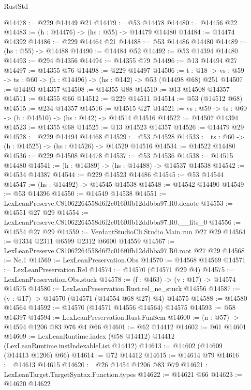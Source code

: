\begin{lexlean}{RustStd}
\begin{coremodule}
@14478 := @229 @14449 @21
@14479 := @53 @14478
@14480 := @14456 @22
@14483 := (h : @14476) -> (hs : @55) -> @14479 @14480
@14484 := @14474 @14392
@14486 := @229 @14464 @21
@14488 := @53 @14486 @14480
@14489 := (hs : @55) -> @14488
@14490 := @14484 @52
@14492 := @53 @14394 @14480
@14493 := @294 @14356
@14494 := @14355 @79
@14496 := @13 @14494 @27
@14497 := @14355 @76
@14498 := @229 @14497
@14506 := {t : @18} ->
  {vs : @59} -> {ts : @60} -> (h : @14496) -> (hs : @142) -> @53 (@14498 @68) @251
@14507 := @14493 @14357
@14508 := @14355 @88
@14510 := @13 @14508 @14357
@14511 := @14355 @66
@14512 := @229 @14511
@14514 := @53 (@14512 @68)
@14515 := @234 @14357
@14516 := @14515 @27
@14521 := {vs : @59} -> {ts : @60} -> (h : @14510) -> (hs : @142) -> @14514 @14516
@14522 := @14507 @14394
@14523 := @14355 @68
@14525 := @13 @14523 @14357
@14526 := @14479 @29
@14528 := @229 @14494 @14468
@14529 := @53 @14528
@14533 := {ts : @60} -> (h : @14525) -> (hs : @14526) -> @14529 @14516
@14534 := @14522 @14480
@14536 := @229 @14508 @14478
@14537 := @53 @14536
@14538 := @14515 @14480
@14541 := (h : @14389) -> (hs : @14488) -> @14537 @14538
@14542 := @14534 @14387
@14544 := @229 @14523 @14486
@14545 := @53 @14544
@14547 := (hs : @14492) -> @14545 @14538
@14548 := @14542 @14490
@14549 := @53 @14396
@14550 := @14549 @14538
@14551 := LexLeanPreserve.C81062264558d6f2c016f0fb12ddbba97.R0.denote
@14553 := @14551 @27 @29
@14554 := LexLeanPreserve.C81062264558d6f2c016f0fb12ddbba97.R0.__fits_0
@14556 := @14554 @27 @29
@14559 := VerdantStudioCli.Studio.Main.run @27 @29
@14564 := @1334 @2311 @6599 @2312 @6600 @14559
@14567 := LexLeanPreserve.C81062264558d6f2c016f0fb12ddbba97.R0.root @27 @29
@14568 := Ne.{1}
@14569 := LexLeanPreservation.Obs
@14570 := @14568 @14569
@14571 := LexLeanPreservation.Rel
@14574 := @14570 (@14571 @29 @4)
@14575 := LexLeanPreservation.Obs.stuck
@14578 := (f : @463) -> (v : @17) -> @14574 @14575
@14580 := LexLeanPreservation.Rust.rel_ne_stuck @14556
@14587 := (v : @17) -> @14570 (@14571 (@14554 @68 @27) @4) @14575
@14588 := @14580 @14564
@14592 := @14570 (@14571 @14556 @14564) @14575
@14593 := @58 @14397
@14594 := LexLeanPreservation.Rust.FunSem
@14600 := (n : @57) -> @14594 @1206 @83 @76 @4 @66
@14601 := @62 @14412
@14602 := @61 @14601
@14609 := LexLeanRuntime.index (@58 @14412) @14412 (LexLeanRuntime.instIndexableList @14412)
@14613 := @14602 (@14609 (@14413 @1206) @66)
@14614 := @72 @14412
@14615 := @14614 @79
@14616 := @14613 @14615
@14620 := @26 @1454 @1206 @83 @79
@14621 := LexLeanTarget.TargetSyntax.Function.types
@14622 := @14621 @66
@14623 := @14620 @14622

\end{coremodule}
\end{lexlean}

